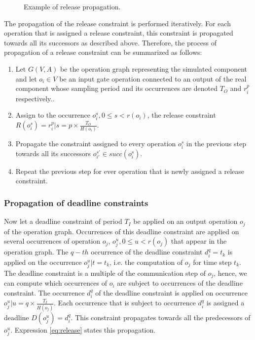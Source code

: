 \begin{figure}[phbt]
\centering

\caption{Example of release propagation.}
\label{fig:rpropagation}
\end{figure}

The propagation of the release constraint is performed iteratively. For each operation that is assigned a release constraint, this constraint is propagated towards all its successors as described above. Therefore, the process of propagation of a release constraint can be summarized as follows:

\begin{enumerate}
\item Let $G(V,A)$ be the operation graph representing the simulated component and let $o_i \in  V$ be an input gate operation connected to an output of the real component whose sampling period and its occurrences are denoted $T_O$ and $r_i^p$ respectively..
\item Assign to the occurrence $o_i^s, 0 \leq s < r(o_i)$, the release constraint $R(o_i^s) = r_i^p | s = p \times \frac{T_O}{H(o_i)}$.
\item Propagate the constraint assigned to every operation $o_i^s$ in the previous step towards all its successors $o_{i'}^{s'} \in succ(o_i^s)$.
\item Repeat the previous step for ever operation that is newly assigned a release constraint.
\end{enumerate}

\subsubsection{Propagation of deadline constraints}

Now let a deadline constraint of period $T_I$ be applied on an output operation $o_j$ of the operation graph. Occurrences of this deadline constraint are applied on several occurrences of operation $o_j$, $o^u_j, 0 \leq u < r(o_j)$ that appear in the operation graph. The $q-th$ occurrence of the deadline constraint $d_i^q = t_k$ is applied on the occurrence $o^u_j | t = t_k$, i.e. the computation of ${o_j}$ for time step $t_k$. The deadline constraint is a multiple of the communication step of $o_j$, hence, we can compute which occurrences of $o_i$ are subject to occurrences of the deadline constraint. The occurrence $d_i^q$ of the deadline constraint is applied on occurrence $o^u_j | u = q \times \frac{T_I}{H(o_j)}$. Each occurrence that is subject to occurrence $d_i^q$ is assigned a deadline $D(o_j^u) = d_i^q$. This constraint propagates towards all the predecessors of $o_j^u$. Expression \ref{eq:release} states this propagation.

